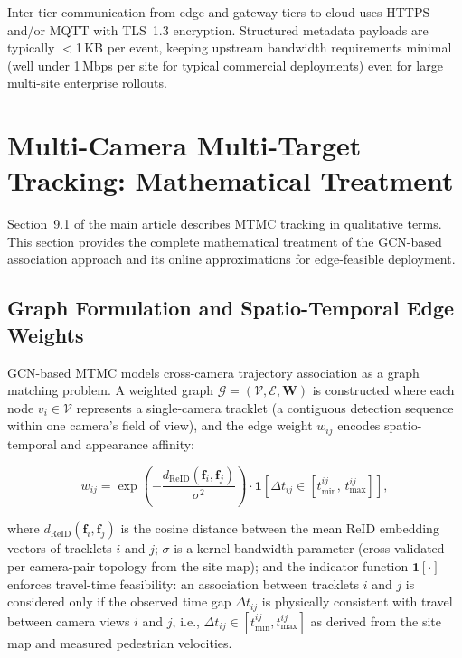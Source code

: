 \documentclass[11pt,a4paper]{article}
\begin{document}
Inter-tier communication from edge and gateway tiers to cloud uses
HTTPS and/or MQTT with TLS~1.3 encryption. Structured metadata
payloads are typically $<$1\,KB per event, keeping upstream bandwidth
requirements minimal (well under 1\,Mbps per site for typical
commercial deployments) even for large multi-site enterprise rollouts.

\section{Multi-Camera Multi-Target Tracking: Mathematical Treatment}
\label{sec:mtmc_math}

\noindent Section~9.1 of the main article describes MTMC tracking
in qualitative terms. This section provides the complete mathematical
treatment of the GCN-based association approach and its online
approximations for edge-feasible deployment.

\subsection{Graph Formulation and Spatio-Temporal Edge Weights}

GCN-based MTMC models cross-camera trajectory association as a graph
matching problem. A weighted graph
$\mathcal{G} = (\mathcal{V}, \mathcal{E}, \mathbf{W})$
is constructed where each node $v_i \in \mathcal{V}$ represents a
single-camera tracklet (a contiguous detection sequence within one
camera's field of view), and the edge weight $w_{ij}$ encodes
spatio-temporal and appearance affinity:

\begin{equation}
  w_{ij} = \exp\!\left(-\frac{d_\mathrm{ReID}(\mathbf{f}_i,
  \mathbf{f}_j)}{\sigma^2}\right)
  \cdot \mathbf{1}\!\left[\Delta t_{ij} \in
  [t_\mathrm{min}^{ij},\, t_\mathrm{max}^{ij}]\right],
  \label{eq:mtmc_edge}
\end{equation}

\noindent where $d_\mathrm{ReID}(\mathbf{f}_i, \mathbf{f}_j)$ is
the cosine distance between the mean ReID embedding vectors of
tracklets $i$ and $j$; $\sigma$ is a kernel bandwidth parameter
(cross-validated per camera-pair topology from the site map);
and the indicator function $\mathbf{1}[\cdot]$ enforces travel-time
feasibility: an association between tracklets $i$ and $j$ is
considered only if the observed time gap $\Delta t_{ij}$ is
physically consistent with travel between camera views $i$ and $j$,
i.e., $\Delta t_{ij} \in [t_\mathrm{min}^{ij}, t_\mathrm{max}^{ij}]$
as derived from the site map and measured pedestrian velocities.
\end{document}
